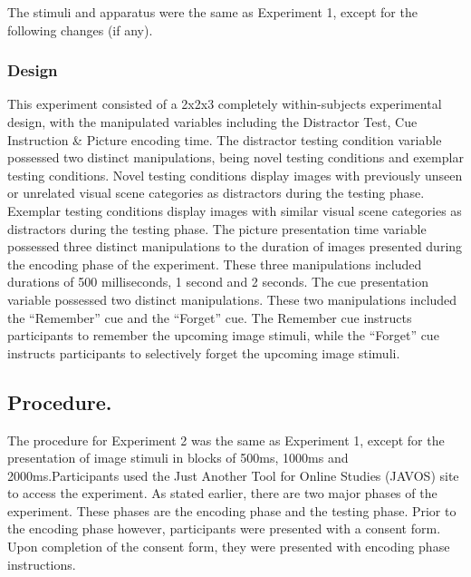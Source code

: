 \documentclass[
  man,floatsintext]{apa6}
\begin{document}
The stimuli and apparatus were the same as Experiment 1, except for the following changes (if any).

\hypertarget{design-1}{%
\subsubsection{Design}\label{design-1}}

This experiment consisted of a 2x2x3 completely within-subjects experimental design, with the manipulated variables including the Distractor Test, Cue Instruction \& Picture encoding time. The distractor testing condition variable possessed two distinct manipulations, being novel testing conditions and exemplar testing conditions. Novel testing conditions display images with previously unseen or unrelated visual scene categories as distractors during the testing phase. Exemplar testing conditions display images with similar visual scene categories as distractors during the testing phase. The picture presentation time variable possessed three distinct manipulations to the duration of images presented during the encoding phase of the experiment. These three manipulations included durations of 500 milliseconds, 1 second and 2 seconds. The cue presentation variable possessed two distinct manipulations. These two manipulations included the ``Remember'' cue and the ``Forget'' cue. The Remember cue instructs participants to remember the upcoming image stimuli, while the ``Forget'' cue instructs participants to selectively forget the upcoming image stimuli.

\hypertarget{procedure.-1}{%
\subsection{Procedure.}\label{procedure.-1}}

The procedure for Experiment 2 was the same as Experiment 1, except for the presentation of image stimuli in blocks of 500ms, 1000ms and 2000ms.Participants used the Just Another Tool for Online Studies (JAVOS) site to access the experiment. As stated earlier, there are two major phases of the experiment. These phases are the encoding phase and the testing phase. Prior to the encoding phase however, participants were presented with a consent form. Upon completion of the consent form, they were presented with encoding phase instructions.
\end{document}
